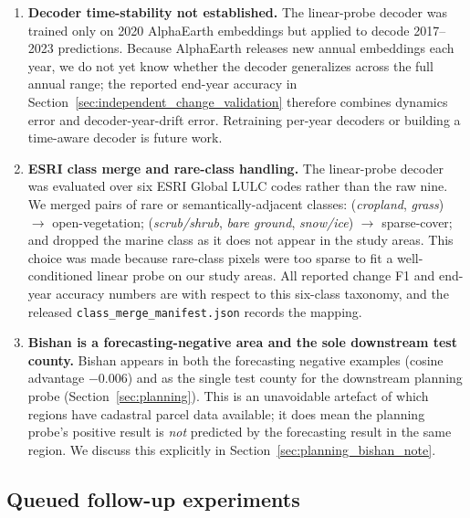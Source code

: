 \documentclass{article}
\begin{document}
\begin{enumerate}
\item \label{lim:decoder_stability} \textbf{Decoder time-stability not established.} The linear-probe decoder was trained only on 2020 AlphaEarth embeddings but applied to decode 2017--2023 predictions. Because AlphaEarth releases new annual embeddings each year, we do not yet know whether the decoder generalizes across the full annual range; the reported end-year accuracy in Section~\ref{sec:independent_change_validation} therefore combines dynamics error and decoder-year-drift error. Retraining per-year decoders or building a time-aware decoder is future work.

\item \label{lim:esri_classes} \textbf{ESRI class merge and rare-class handling.} The linear-probe decoder was evaluated over six ESRI Global LULC codes rather than the raw nine. We merged pairs of rare or semantically-adjacent classes: (\emph{cropland}, \emph{grass}) $\to$ open-vegetation; (\emph{scrub/shrub}, \emph{bare ground}, \emph{snow/ice}) $\to$ sparse-cover; and dropped the marine class as it does not appear in the study areas. This choice was made because rare-class pixels were too sparse to fit a well-conditioned linear probe on our study areas. All reported change F1 and end-year accuracy numbers are with respect to this six-class taxonomy, and the released \texttt{class\_merge\_manifest.json} records the mapping.

\item \label{lim:bishan_role} \textbf{Bishan is a forecasting-negative area and the sole downstream test county.} Bishan appears in both the forecasting negative examples (cosine advantage $-0.006$) and as the single test county for the downstream planning probe (Section~\ref{sec:planning}). This is an unavoidable artefact of which regions have cadastral parcel data available; it does mean the planning probe's positive result is \emph{not} predicted by the forecasting result in the same region. We discuss this explicitly in Section~\ref{sec:planning_bishan_note}.
\end{enumerate}

\subsection{Queued follow-up experiments}
\label{sec:queued_experiments}
\end{document}
